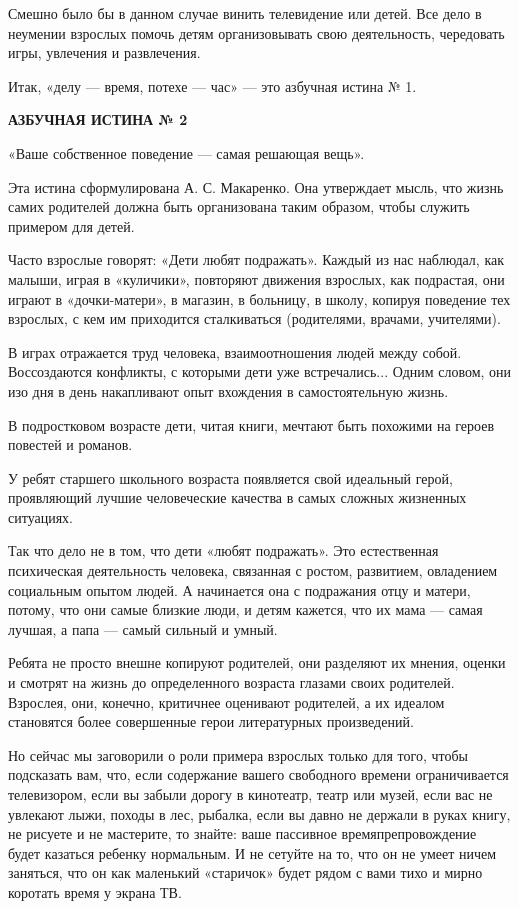 \documentclass[12pt, a4paper, openany]{book}
\begin{document}
Смешно было бы в данном случае винить телевидение или детей. Все дело в неумении взрослых помочь детям организовывать свою деятельность, чередовать игры, увлечения и развлечения. 

Итак, «делу — время, потехе — час» — это азбучная истина № 1. 

\begin{center}
	\textbf{АЗБУЧНАЯ ИСТИНА № 2 }

«Ваше собственное поведение — самая решающая вещь». 
\end{center}

Эта истина сформулирована А. С. Макаренко. Она утверждает мысль, что жизнь самих родителей должна быть организована таким образом, чтобы служить примером для детей. 

Часто взрослые говорят: «Дети любят подражать». Каждый из нас наблюдал, как малыши, играя в «куличики», повторяют движения взрослых, как подрастая, они играют в «дочки-матери», в магазин, в больницу, в школу, копируя поведение тех взрослых, с кем им приходится сталкиваться (родителями, врачами, учителями). 

В играх отражается труд человека, взаимоотношения людей между собой. Воссоздаются конфликты, с которыми дети уже встречались... Одним словом, они изо дня в день накапливают опыт вхождения в самостоятельную жизнь. 

В подростковом возрасте дети, читая книги, мечтают быть похожими на героев повестей и романов. 

У ребят старшего школьного возраста появляется свой идеальный герой, проявляющий лучшие человеческие качества в самых сложных жизненных ситуациях. 

Так что дело не в том, что дети «любят подражать». Это естественная психическая деятельность человека, связанная с ростом, развитием, овладением социальным опытом людей. А начинается она с подражания отцу и матери, потому, что они самые близкие люди, и детям кажется, что их мама — самая лучшая, а папа — самый сильный и умный. 

Ребята не просто внешне копируют родителей, они разделяют их мнения, оценки и смотрят на жизнь до определенного возраста глазами своих родителей. Взрослея, они, конечно, критичнее оценивают родителей, а их идеалом становятся более совершенные герои литературных произведений. 

Но сейчас мы заговорили о роли примера взрослых только для того, чтобы подсказать вам, что, если содержание вашего свободного времени ограничивается телевизором, если вы забыли дорогу в кинотеатр, театр или музей, если вас не увлекают лыжи, походы в лес, рыбалка, если вы давно не держали в руках книгу, не рисуете и не мастерите, то знайте: ваше пассивное времяпрепровождение будет казаться ребенку нормальным. И не сетуйте на то, что он не умеет ничем заняться, что он как маленький «старичок» будет рядом с вами тихо и мирно коротать время у экрана ТВ. 
\end{document}
